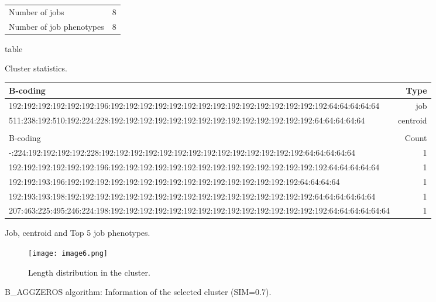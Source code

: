 \documentclass{jhps}
\begin{document}
\begin{figure}
	\begin{subtable}{\textwidth}
		\centering
		\begin{tabular}{ll}
			Number of jobs & 8 \\
			Number of job phenotypes & 8 \\
		\end{tabular}
		\caption{table}{Cluster statistics.}
		\label{cluster:use_case:bin_all:stats}
	\end{subtable}
	\medskip
	\begin{subtable}{\textwidth}
		\centering
		\begin{tiny}
			\begin{tabular}{l|r}
				\rowcolor{tblhead}
				B-coding                                                                                             &  Type     \\
				\hline
				192:192:192:192:192:192:196:192:192:192:192:192:192:192:192:192:192:192:192:192:192:192:64:64:64:64:64    &  job      \\
				511:238:192:510:192:224:228:192:192:192:192:192:192:192:192:192:192:192:192:192:192:64:64:64:64:64        &  centroid \\
				\multicolumn{2}{l}{}                                                                                      \\
				\rowcolor{tblhead}
				B-coding                                                                                             &  Count    \\
				\hline
				-:224:192:192:192:192:228:192:192:192:192:192:192:192:192:192:192:192:192:192:192:64:64:64:64:64          &  1        \\
				192:192:192:192:192:192:196:192:192:192:192:192:192:192:192:192:192:192:192:192:192:192:64:64:64:64:64    &  1        \\
				192:192:193:196:192:192:192:192:192:192:192:192:192:192:192:192:192:192:192:192:64:64:64:64               &  1        \\
				192:193:193:198:192:192:192:192:192:192:192:192:192:192:192:192:192:192:192:192:192:64:64:64:64:64:64     &  1        \\
				207:463:225:495:246:224:198:192:192:192:192:192:192:192:192:192:192:192:192:192:192:192:64:64:64:64:64:64 &  1        \\
			\end{tabular}
		\end{tiny}
		\caption{Job, centroid and Top 5 job phenotypes.}
		\label{cluster:use_case:bin_all:top_jobs}
	\end{subtable}
	\medskip
	\begin{subfigure}{\textwidth}
		\centering
		\texttt{[image: image6.png]}
		\caption{Length distribution in the cluster.}
		\label{cluster:use_case:bin_all:length}
	\end{subfigure}
	\caption{B\_AGGZEROS algorithm: Information of the selected cluster (SIM=0.7).}
	\label{cluster:use_case:bin_all}
\end{figure}
\end{document}
